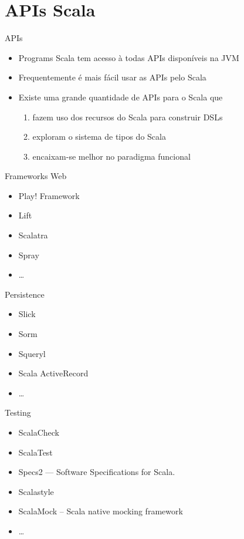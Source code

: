 \documentclass[12pt]{beamer}
\begin{document}
\section{APIs Scala}
\begin{frame}{APIs}
\begin{itemize}
\item Programs Scala tem acesso à todas APIs disponíveis na JVM
\pause
\item Frequentemente é mais fácil usar as APIs pelo Scala
\pause 
\item Existe uma grande quantidade de APIs para o Scala que
\begin{enumerate}
  \item fazem uso dos recursos do Scala para construir DSLs
  \pause
  \item exploram o sistema de tipos do Scala
  \pause
  \item encaixam-se melhor no paradigma funcional
\end{enumerate}
\end{itemize}
\end{frame}

\begin{frame}{Frameworks Web}
\begin{itemize}
\item Play! Framework
\item Lift
\item Scalatra
\item Spray
\item \dots
\end{itemize}
\end{frame}

\begin{frame}{Persistence}
\begin{itemize}
\item Slick
\item Sorm
\item Squeryl
\item Scala ActiveRecord
\item \dots 
\end{itemize}
\end{frame}

\begin{frame}{Testing}
\begin{itemize}
\item ScalaCheck
\item ScalaTest 
\item Specs2 — Software Specifications for Scala.
\item Scalastyle
\item ScalaMock – Scala native mocking framework
\item \dots
\end{itemize}
\end{frame}
\end{document}
